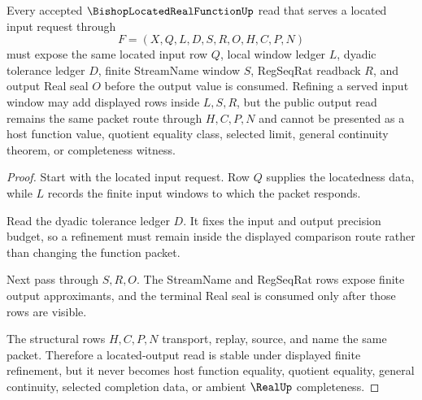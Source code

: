 \begin{theorem}
\label{thm:bishop-located-real-function-located-output-stability}
Every accepted $\BishopLocatedRealFunctionUp$ read that serves a located input request through
$$
F=(X,Q,L,D,S,R,O,H,C,P,N)
$$
must expose the same located input row $Q$, local window ledger $L$, dyadic tolerance ledger $D$, finite StreamName window $S$, RegSeqRat readback $R$, and output Real seal $O$ before the output value is consumed. Refining a served input window may add displayed rows inside $L,S,R$, but the public output read remains the same packet route through $H,C,P,N$ and cannot be presented as a host function value, quotient equality class, selected limit, general continuity theorem, or completeness witness.
\end{theorem}
\begin{proof}
Start with the located input request. Row $Q$ supplies the locatedness data, while $L$ records the finite input windows to which the packet responds.

Read the dyadic tolerance ledger $D$. It fixes the input and output precision budget, so a refinement must remain inside the displayed comparison route rather than changing the function packet.

Next pass through $S,R,O$. The StreamName and RegSeqRat rows expose finite output approximants, and the terminal Real seal is consumed only after those rows are visible.

The structural rows $H,C,P,N$ transport, replay, source, and name the same packet. Therefore a located-output read is stable under displayed finite refinement, but it never becomes host function equality, quotient equality, general continuity, selected completion data, or ambient $\RealUp$ completeness.
\end{proof}



